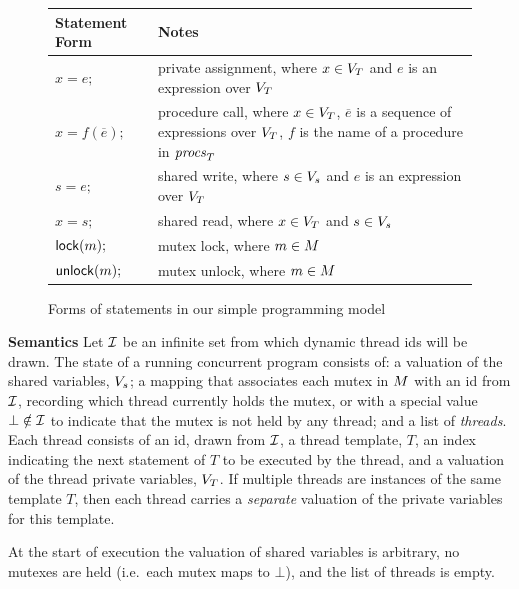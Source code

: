 \begin{figure}
\begin{tabular}{lp{5.5cm}}
\textbf{Statement Form} & \textbf{Notes} \\
\toprule

$x = e;$ & private assignment, where $x \in V_{T}$ and $e$ is an expression over $V_{T}$ \\
\midrule

$x = f(\overline{e});$ & procedure call, where $x \in V_{T}$, $\overline{e}$ is a sequence of expressions over $V_{T}$, $f$ is the name of a procedure in $\mathit{procs}_{T}$ \\
\midrule

$s = e;$ & shared write, where $s \in V_s$ and $e$ is an expression over $V_{T}$ \\
\midrule

$x = s;$ & shared read,  where $x \in V_{T}$ and $s \in V_s$ \\
\midrule

$\mathsf{lock}(m);$   & mutex lock, where $m \in M$ \\
\midrule

$\mathsf{unlock}(m);$ & mutex unlock, where $m \in M$\\
\bottomrule
\end{tabular}
\caption{Forms of statements in our simple programming model}
\label{fig:statements}
\end{figure}

\medskip\noindent\textbf{Semantics }
%
Let $\mathcal{I}$ be an infinite set from which dynamic thread ids will be drawn.  The state of a running concurrent program consists of: a valuation of the shared variables, $V_s$; a mapping that associates each mutex in $M$ with an id from $\mathcal{I}$, recording which thread currently holds the mutex, or with a special value $\bot \notin \mathcal{I}$ to indicate that the mutex is not held by any thread; and a list of \emph{threads}.  Each thread consists of an id, drawn from $\mathcal{I}$, a thread template, $T$, an index indicating the next statement of $T$ to be executed by the thread, and a valuation of the thread private variables, $V_{T}$.  If multiple threads are instances of the same template $T$, then each thread carries a \emph{separate} valuation of the private variables for this template.

At the start of execution the valuation of shared variables is arbitrary, no mutexes are held (i.e.\ each mutex maps to $\bot$), and the list of threads is empty.

